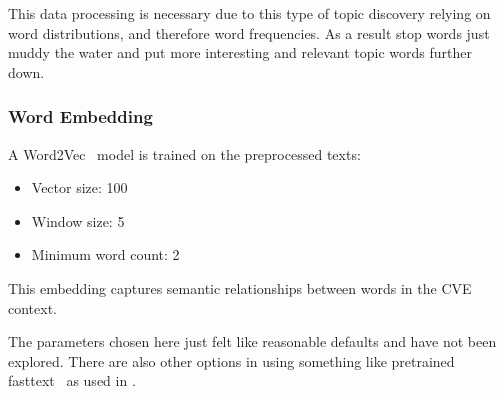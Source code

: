 \documentclass[12pt]{article}
\begin{document}
This data processing is necessary due to this type of topic discovery relying on word distributions,
and therefore word frequencies. As a result stop words just muddy the water and put more interesting
and relevant topic words further down.

\subsubsection{Word Embedding}

A Word2Vec~\cite{word2vec} model is trained on the preprocessed texts:

\begin{itemize} \item Vector size: 100 \item Window size: 5 \item Minimum word count: 2
\end{itemize}

This embedding captures semantic relationships between words in the CVE context.

The parameters chosen here just felt like reasonable defaults and have not been explored. There are
also other options in using something like pretrained fasttext~\cite{fasttext} as used in
\cite{nvd_clustering_fasttext}.







\end{document}
